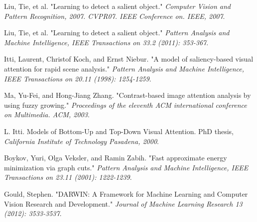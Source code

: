 \documentclass[10pt,twocolumn,letterpaper]{article}
\begin{document}
\begin{thebibliography}{99} \fontsize{9pt}{50} \setlength{\itemsep}{-0.5pt} 
     Liu, Tie, et al. "Learning to detect a salient object." 
        \textit{Computer Vision and Pattern Recognition, 2007. CVPR07. IEEE Conference on. IEEE, 2007}.

     Liu, Tie, et al. "Learning to detect a salient object." 
        \textit{Pattern Analysis and Machine Intelligence, IEEE Transactions on 33.2 (2011): 353-367}. 

     Itti, Laurent, Christof Koch, and Ernst Niebur. "A model of saliency-based visual attention for rapid scene analysis."
        \textit{Pattern Analysis and Machine Intelligence, IEEE Transactions on 20.11 (1998): 1254-1259}.

     Ma, Yu-Fei, and Hong-Jiang Zhang. "Contrast-based image attention analysis by using fuzzy growing."
        \textit{ Proceedings of the eleventh ACM international conference on Multimedia. ACM, 2003}. 

     L. Itti. Models of Bottom-Up and Top-Down Visual Attention. PhD thesis, 
        \textit{California Institute of Technology Pasadena, 2000}.

     Boykov, Yuri, Olga Veksler, and Ramin Zabih. "Fast approximate energy minimization via graph cuts." 
        \textit{Pattern Analysis and Machine Intelligence, IEEE Transactions on 23.11 (2001): 1222-1239}.

     Gould, Stephen. "DARWIN: A Framework for Machine Learning and Computer Vision Research and Development." 
        \textit{Journal of Machine Learning Research 13 (2012): 3533-3537}.

\end{thebibliography}
\end{document}

